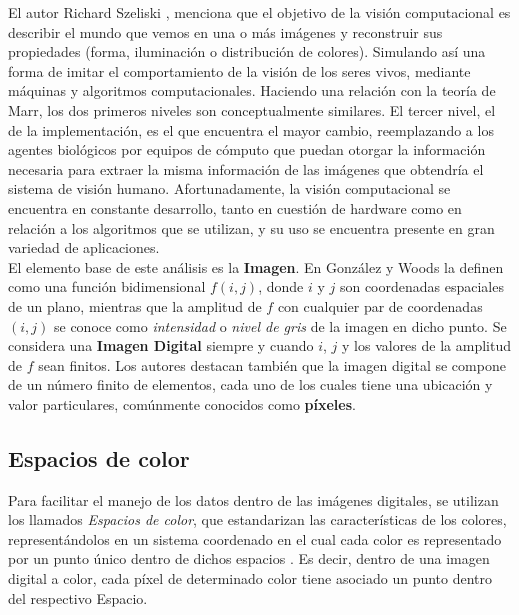 El autor Richard Szeliski \cite{szeliski_computer_2022}, menciona que el objetivo de la visión computacional es describir el mundo que vemos en una o más imágenes y reconstruir sus propiedades (forma, iluminación o distribución de colores). Simulando así una forma de imitar el comportamiento de la visión de los seres vivos, mediante máquinas y algoritmos computacionales. Haciendo una relación con la teoría de Marr, los dos primeros niveles son conceptualmente similares. El tercer nivel, el de la implementación, es el que encuentra el mayor cambio, reemplazando a los agentes biológicos por equipos de cómputo que puedan otorgar la información necesaria para extraer la misma información de las imágenes que obtendría el sistema de visión humano.
Afortunadamente, la visión computacional se encuentra en constante desarrollo, tanto en cuestión de hardware como en relación a los algoritmos que se utilizan, y su uso se encuentra presente en gran variedad de aplicaciones.\\

El elemento base de este análisis es la \textbf{Imagen}. En \cite{gonzalez_digital_2002} González y Woods la definen como una función bidimensional $f(i,j)$, donde $i$ y $j$ son coordenadas espaciales de un plano, mientras que la amplitud de $f$ con cualquier par de coordenadas $(i,j)$ se conoce como \textit{intensidad} o \textit{nivel de gris} de la imagen en dicho punto. Se considera una \textbf{Imagen Digital} siempre y cuando $i$, $j$ y los valores de la amplitud de $f$ sean finitos. Los autores destacan también que la imagen digital se compone de un número finito de elementos, cada uno de los cuales tiene una ubicación y valor particulares, comúnmente conocidos como \textbf{píxeles}.

\subsection{Espacios de color}
Para facilitar el manejo de los datos dentro de las imágenes digitales, se utilizan los llamados \textit{Espacios de color}, que estandarizan las características de los colores, representándolos en un sistema coordenado en el cual cada color es representado por un punto único dentro de dichos espacios \cite{gonzalez_digital_2002}. Es decir, dentro de una imagen digital a color, cada píxel de determinado color tiene asociado un punto dentro del respectivo Espacio.

